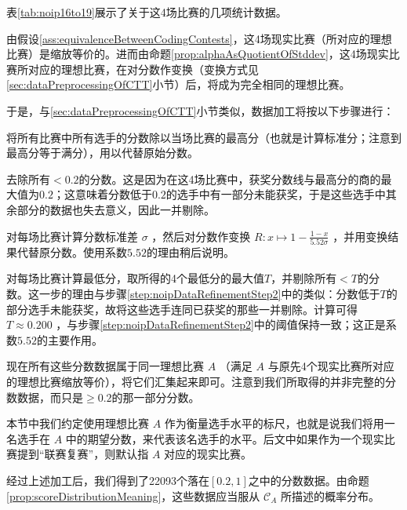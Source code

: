         表\ref{tab:noip16to19}展示了关于这4场比赛的几项统计数据。

        \vspace{1.5ex}

        由假设\ref{ass:equivalenceBetweenCodingContests}，这4场现实比赛（所对应的理想比赛）是缩放等价的。进而由命题\ref{prop:alphaAsQuotientOfStddev}，这4场现实比赛所对应的理想比赛，在对分数作变换（变换方式见\ref{sec:dataPreprocessingOfCTT}小节）后，将成为完全相同的理想比赛。

        于是，与\ref{sec:dataPreprocessingOfCTT}小节类似，数据加工将按以下步骤进行：
        \begin{asparaenum}[\bfseries{步骤} 1.]
            \item 将所有比赛中所有选手的分数除以当场比赛的最高分（也就是计算标准分；注意到最高分等于满分），用以代替原始分数。
            \item \label{step:noipDataRefinementStep2} 去除所有$<0.2$的分数。这是因为在这4场比赛中，获奖分数线与最高分的商的最大值为$0.2$；这意味着分数低于$0.2$的选手中有一部分未能获奖，于是这些选手中其余部分的数据也失去意义，因此一并剔除。
            \item 对每场比赛计算分数标准差 $\sigma$ ，然后对分数作变换 $R:x\mapsto 1-\frac{1-x}{5.52\sigma}$ ，并用变换结果代替原分数。使用系数$5.52$的理由稍后说明。
            \item 对每场比赛计算最低分，取所得的4个最低分的最大值$T$，并剔除所有$<T$的分数。这一步的理由与步骤\ref{step:noipDataRefinementStep2}中的类似：分数低于$T$的部分选手未能获奖，故将这些选手连同已获奖的那些一并剔除。计算可得 $T\approx 0.200$ ，与步骤\ref{step:noipDataRefinementStep2}中的阈值保持一致；这正是系数$5.52$的主要作用。
            \item 现在所有这些分数数据属于同一理想比赛 $A$ （满足 $A$ 与原先4个现实比赛所对应的理想比赛缩放等价），将它们汇集起来即可。注意到我们所取得的并非完整的分数数据，而只是$\geq 0.2$的那一部分分数。
        \end{asparaenum}

        \vspace{1.5ex}

        本节中我们约定使用理想比赛 $A$ 作为衡量选手水平的标尺，也就是说我们将用一名选手在 $A$ 中的期望分数，来代表该名选手的水平。后文中如果作为一个现实比赛提到“联赛复赛”，则默认指 $A$ 对应的现实比赛。

        \vspace{1.5ex}

        经过上述加工后，我们得到了22093个落在$[0.2,1]$之中的分数数据。由命题\ref{prop:scoreDistributionMeaning}，这些数据应当服从 $\mathcal{C}_A$ 所描述的概率分布。
        
